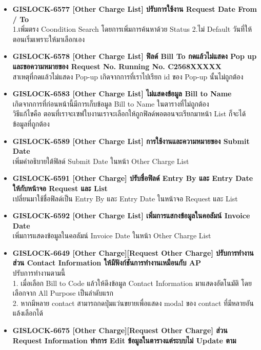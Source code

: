 \begin{itemize}
    \item \textbf{{GISLOCK-6577 [Other Charge List] ปรับการใช้งาน Request Date From / To}} \\
          1.เพิ่มตรง Coondition Search โดยการเพิ่มการค้นหาด้วย Status 
          2.ไม่ Default วันที่ให้ตอนเริ่มเพราะให้มาเลือกเอง
    \item \textbf{{GISLOCK-6578 [Other Charge List] ฟิลด์ Bill To กดแล้วไม่แสดง Pop up และขอความหมายของ Request No. Running No. C2568XXXXX}} \\
          สาเหตุที่กดแล้วไม่แสดง Pop-up เกิดจากการที่เราไปเรียก id ของ Pop-up นั้นไม่ถูกต้อง
    \item \textbf{{GISLOCK-6583 [Other Charge List] ไม่แสดงข้อมูล Bill to Name}} \\
          เกิดจากการที่ก่อนหน้านี้มีการเก็บข้อมูล Bill to Name ในตารางที่ไม่ถูกต้อง \\
          วิธีแก้ไขคือ ตอนที่เราจะเซฟใบงานเราจะเลือกให้ถูกฟิลด์พอตอนจะเรียกมาหน้า List ก็จะได้ข้อมูลที่ถูกต้อง
    \item \textbf{{GISLOCK-6589 [Other Charge List] การใช้งานและความหมายของ Submit Date}} \\
          เพิ่มคำอธิบายใต้ฟิลด์ Submit Date ในหน้า Other Charge List 
    \item \textbf{{GISLOCK-6591 [Other Charge] ปรับชื่อฟิลด์ Entry By และ Entry Date ให้กับหน้าจอ Request และ List}} \\
          เปลี่ยนมาใช้ชื่อฟิลด์เป็น Entry By และ Entry Date ในหน้าจอ Request และ List 
    \item \textbf{{GISLOCK-6592 [Other Charge List] เพิ่มการแสกงข้อมูลในคอลัมน์ Invoice Date}} \\
          เพิ่มการแสดงข้อมูลในคอลัมน์ Invoice Date ในหน้า Other Charge List 
    \item \textbf{{GISLOCK-6649 [Other Charge][Request Other Charge] ปรับการทำงานส่วน Contact Information ให้มีฟังก์ชันการทำงานเหมือนกับ AP}} \\
          ปรับการทำงานตามนี้ \: \\
          1. เมื่อเลือก Bill to Code แล้วให้ดึงข้อมูล Contact Information มาแสดงอัตโนมัติ โดยเลือกจาก All Purpose เป็นลำดับแรก \\
          2. หากมีหลาย contact สามารถกดปุ่มแว่นขยายเพื่อแสดง modal ของ contact ที่มีหลายอันแล้งเลือกได้
    \item \textbf{{GISLOCK-6675 [Other Charge][Request Other Charge] ส่วน Request Information ทำการ Edit ข้อมูลในตารางแต่ระบบไม่ Update ตาม}} \\

\end{itemize}
